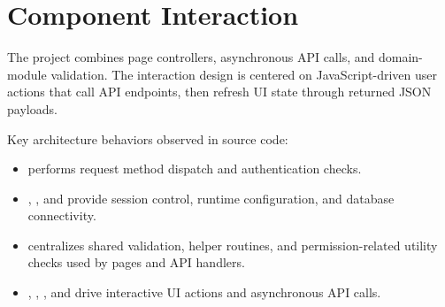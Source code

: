 \section{Component Interaction}

The project combines page controllers, asynchronous API calls, and domain-module validation.
The interaction design is centered on JavaScript-driven user actions that call API endpoints,
then refresh UI state through returned JSON payloads.





Key architecture behaviors observed in source code:
\begin{itemize}
    \item {} performs request method dispatch and authentication checks.
    \item {}, , and  provide session control, runtime configuration, and database connectivity.
    \item {} centralizes shared validation, helper routines, and permission-related utility checks used by pages and API handlers.
    \item {}, , , and  drive interactive UI actions and asynchronous API calls.
\end{itemize}
